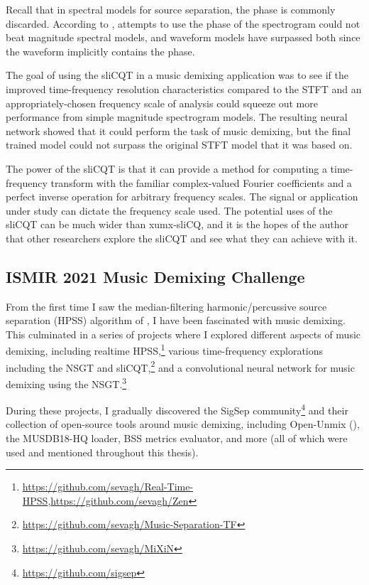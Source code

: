 \documentclass[report.tex]{subfiles}
\begin{document}
Recall that in spectral models for source separation, the phase is commonly discarded. According to \textcite{endtoend}, attempts to use the phase of the spectrogram could not beat magnitude spectral models, and waveform models have surpassed both since the waveform implicitly contains the phase.

The goal of using the sliCQT in a music demixing application was to see if the improved time-frequency resolution characteristics compared to the STFT and an appropriately-chosen frequency scale of analysis could squeeze out more performance from simple magnitude spectrogram models. The resulting neural network showed that it could perform the task of music demixing, but the final trained model could not surpass the original STFT model that it was based on.

The power of the sliCQT is that it can provide a method for computing a time-frequency transform with the familiar complex-valued Fourier coefficients and a perfect inverse operation for arbitrary frequency scales. The signal or application under study can dictate the frequency scale used. The potential uses of the sliCQT can be much wider than xumx-sliCQ, and it is the hopes of the author that other researchers explore the sliCQT and see what they can achieve with it.

\newpagefill

\subsection{ISMIR 2021 Music Demixing Challenge}

From the first time I saw the median-filtering harmonic/percussive source separation (HPSS) algorithm of \textcite{fitzgerald1}, I have been fascinated with music demixing. This culminated in a series of projects where I explored different aspects of music demixing, including realtime HPSS,\footnote{\url{https://github.com/sevagh/Real-Time-HPSS},\url{https://github.com/sevagh/Zen}} various time-frequency explorations including the NSGT and sliCQT,\footnote{\url{https://github.com/sevagh/Music-Separation-TF}} and a convolutional neural network for music demixing using the NSGT.\footnote{\url{https://github.com/sevagh/MiXiN}}

During these projects, I gradually discovered the SigSep community\footnote{\url{https://github.com/sigsep}} and their collection of open-source tools around music demixing, including Open-Unmix (\cite{umx}), the MUSDB18-HQ loader, BSS metrics evaluator, and more (all of which were used and mentioned throughout this thesis).
\end{document}
